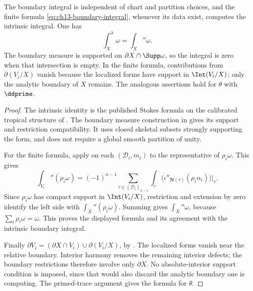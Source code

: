 \begin{proposition}
\label{prop:ch13-boundary-welldefined}
The boundary integral is independent of chart and partition choices, and
the finite formula \eqref{eq:ch13-boundary-integral}, whenever its data
exist, computes the intrinsic integral.  One has
\[
 \int_X^\partial\omega=\int_X\dprime\omega.
\]
The boundary measure is supported on
$\partial X\cap\Supp\omega$, so the integral is zero when that
intersection is empty.  In the finite formula, contributions from
$\partial(V_i/X)$ vanish because the localized forms have support in
$\Int(V_i/X)$; only the analytic boundary of $X$ remains.
The analogous assertions hold for $\theta$ with $\ddprime$.
\end{proposition}

\begin{proof}
The intrinsic identity is the published Stokes formula
\cite[Proposition~5.11.1]{CLD25} on the calibrated tropical structure of
.  The boundary measure construction
in \cite[\S5.9]{CLD25} gives its support and restriction compatibility.
It uses closed skeletal subsets strongly supporting the form, and does
not require a global smooth partition of unity.

For the finite formula, apply  on each
$(\mathscr D_i,m_i)$ to the representative of $\rho_i\omega$.  This gives
\[
 \int_{V_i}\dprime(\rho_i\omega)
 =(-1)^{n-1}\sum_{\tau\in(\mathscr D_i)_{n-1}}
   \int_\tau\bigl(\iota''_{\mathbf N(\tau)}
                         (\rho_i\alpha_i)\bigr)\big|_\tau.
\]
Since $\rho_i\omega$ has compact support in $\Int(V_i/X)$, restriction
and extension by zero identify the left side with
$\int_X\dprime(\rho_i\omega)$.  Summing gives
$\int_X\dprime\omega$, because $\sum_i\rho_i\omega=\omega$.
This proves the displayed formula and its agreement with the intrinsic
boundary integral.

Finally
$\partial V_i=(\partial X\cap V_i)\cup\partial(V_i/X)$, by
\cite[\S15.7.2]{CLD25}.  The localized forms vanish near the relative
boundary.  Interior harmony removes the remaining interior defects;
the boundary restrictions therefore involve only $\partial X$.
No absolute-interior support condition is imposed, since that would
also discard the analytic boundary one is computing.  The primed-trace
argument gives the formula for $\theta$.
\end{proof}

